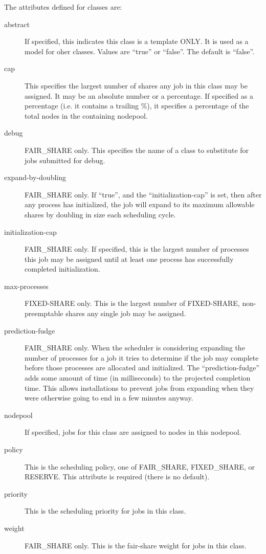     The attributes defined for classes are:
    \begin{description}
      \item[abstract] If specified, this indicates this class is a template ONLY. It is used
        as a model for oher classes.  Values are ``true'' or ``false''.  The default is
        ``false''.
      \item[cap] This specifies the largest number of shares any job in this class
        may be assigned.  It may be an absolute number or a percentage.  If specified as
        a percentage (i.e. it contains a trailing \%), it specifies a percentage of the
        total nodes in the containing nodepool.
      \item[debug] FAIR_SHARE only. This specifies the name of a class to substitute
        for jobs submitted for debug.
      \item[expand-by-doubling] FAIR_SHARE only.  If ``true'', and the ``initialization-cap'' is
        set, then after any process has initialized, the job will expand to its maximum allowable
        shares by doubling in size each scheduling cycle.
      \item[initialization-cap] FAIR_SHARE only. If specified, this is the largest number of processes this job
        may be assigned until at least one process has successfully completed initialization.
      \item[max-processes] FIXED-SHARE only.  This is the largest number of FIXED-SHARE,
        non-preemptable shares any single job may be assigned.
      \item[prediction-fudge] FAIR_SHARE only. When the scheduler is considering expanding the
        number of processes for a job it tries to determine if the job may complete before those
        processes are allocated and initialized.  The ``prediction-fudge'' adds some amount of 
        time (in milliseconds) to the projected completion time.  This allows installations to
        prevent jobs from expanding when they were otherwise going to end in a few minutes
        anyway.
      \item[nodepool] If specified, jobs for this class are assigned to nodes in this nodepool. 
      \item[policy] This is the scheduling policy, one of FAIR_SHARE, FIXED_SHARE, or RESERVE. This
        attribute is required (there is no default).
      \item[priority] This is the scheduling priority for jobs in this class.
      \item[weight] FAIR_SHARE only. This is the fair-share weight for jobs in this class.
      
    \end{description}
    
